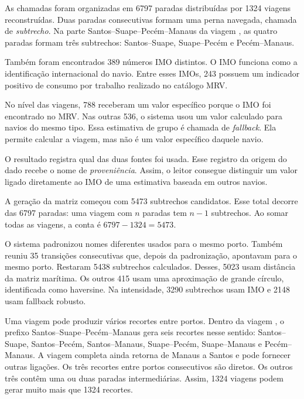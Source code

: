 As chamadas foram organizadas em \num{6797} paradas distribuídas por \num{1324} viagens reconstruídas. Duas paradas consecutivas formam uma perna navegada, chamada de \emph{subtrecho}. Na parte Santos--Suape--Pecém--Manaus da viagem , as quatro paradas formam três subtrechos: Santos--Suape, Suape--Pecém e Pecém--Manaus.

Também foram encontrados \num{389} números IMO distintos. O IMO funciona como a identificação internacional do navio. Entre esses IMOs, \num{243} possuem um indicador positivo de consumo por trabalho realizado no catálogo MRV.

No nível das viagens, \num{788} receberam um valor específico porque o IMO foi encontrado no MRV. Nas outras \num{536}, o sistema usou um valor calculado para navios do mesmo tipo. Essa estimativa de grupo é chamada de \emph{fallback}. Ela permite calcular a viagem, mas não é um valor específico daquele navio.

O resultado registra qual das duas fontes foi usada. Esse registro da origem do dado recebe o nome de \emph{proveniência}. Assim, o leitor consegue distinguir um valor ligado diretamente ao IMO de uma estimativa baseada em outros navios.

A geração da matriz começou com \num{5473} subtrechos candidatos. Esse total decorre das \num{6797} paradas: uma viagem com \(n\) paradas tem \(n-1\) subtrechos. Ao somar todas as viagens, a conta é \(6797-1324=5473\).

O sistema padronizou nomes diferentes usados para o mesmo porto. Também reuniu \num{35} transições consecutivas que, depois da padronização, apontavam para o mesmo porto. Restaram \num{5438} subtrechos calculados. Desses, \num{5023} usam distância da matriz marítima. Os outros \num{415} usam uma aproximação de grande círculo, identificada como haversine. Na intensidade, \num{3290} subtrechos usam IMO e \num{2148} usam fallback robusto.

Uma viagem pode produzir vários recortes entre portos. Dentro da viagem , o prefixo Santos--Suape--Pecém--Manaus gera seis recortes nesse sentido: Santos--Suape, Santos--Pecém, Santos--Manaus, Suape--Pecém, Suape--Manaus e Pecém--Manaus. A viagem completa ainda retorna de Manaus a Santos e pode fornecer outras ligações. Os três recortes entre portos consecutivos são diretos. Os outros três contêm uma ou duas paradas intermediárias. Assim, \num{1324} viagens podem gerar muito mais que \num{1324} recortes.

